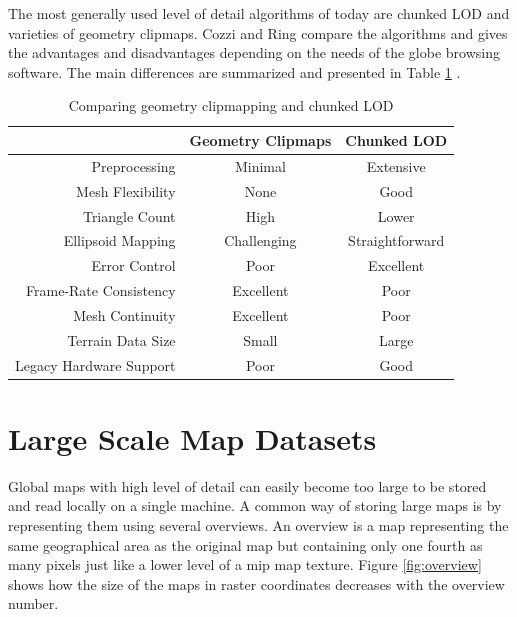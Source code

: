 The most generally used level of detail algorithms of today are chunked LOD and varieties of geometry clipmaps. Cozzi and Ring compare the algorithms and gives the advantages and disadvantages depending on the needs of the globe browsing software. The main differences are summarized and presented in Table \ref{table:lodcomparison} \cite[p. 464]{cozzi11}. 
\begin{center}
  \begin{table}
  \caption[]{Comparing geometry clipmapping and chunked LOD}
    \label{table:lodcomparison}
  \begin{tabular}{| r | c | c |}
    \hline
                            & \textbf{Geometry Clipmaps} & \textbf{Chunked LOD} \\ \hline

    Preprocessing           & Minimal           & Extensive \\
    Mesh Flexibility        & None              & Good \\
    Triangle Count          & High              & Lower \\
    Ellipsoid Mapping       & Challenging       & Straightforward \\
    Error Control           & Poor              & Excellent \\
    Frame-Rate Consistency  & Excellent         & Poor \\
    Mesh Continuity         & Excellent         & Poor \\
    Terrain Data Size       & Small             & Large \\
    Legacy Hardware Support & Poor              & Good \\
    \hline
  \end{tabular}
  \end{table}
\end{center}



\section{Large Scale Map Datasets}

Global maps with high level of detail can easily become too large to be stored and read locally on a single machine. A common way of storing large maps is by representing them using several overviews. An overview is a map representing the same geographical area as the original map but containing only one fourth as many pixels just like a lower level of a mip map texture. Figure \ref{fig:overview} shows how the size of the maps in raster coordinates decreases with the overview number.

